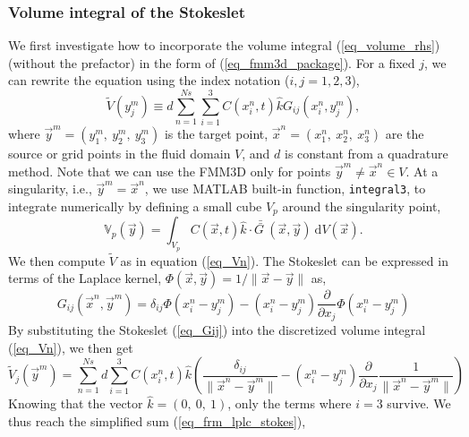 \subsubsection{Volume integral of the Stokeslet}
We first investigate how to incorporate the volume integral (\ref{eq_volume_rhs}) (without the prefactor) in the form of (\ref{eq_fmm3d_package}). For a fixed $j$, we can rewrite the equation using the index notation ($i, j = 1,2,3$), 
\begin{equation}
	\tilde{V}(y_j^m)
	\equiv
	 d\sum_{n = 1}^{Ns} \sum_{i = 1}^{3}
	 C(x^n_i,  t)\hat{k} G_{ij}(x_i^n,y_j^m),
	\label{eq_Vn}
\end{equation}
where $\vec{y}^m = (y_1^m, \ y_2^m, \ y_3^m)$ is the target point, $\vec{x}^n = (x_1^n, \ x_2^n, \ x_3^n)$ are the source or grid points in the fluid domain $V$, and $d$ is constant from a quadrature method.
Note that we can use the FMM3D only for points $\vec{y}^m \neq \vec{x}^n \in V$. 
At a singularity, i.e.,  $\vec{y}^m = \vec{x}^n $, we use MATLAB built-in function, \verb+integral3+, to integrate numerically by defining a small cube $V_p$ around the singularity point,
\begin{equation}
	\mathbb{V}_p(\vec{y}) = 
	 \int_{{V}_p}
		C (\vec{x},t ) \hat{k} \cdot 
		\bar{\bar{G \ }} (\vec{x}, \vec{y} ) 
		\ \text{d}V(\vec{x}).
		\label{eq_vol_int_singular}
	\end{equation}
We then compute $\tilde{V}$ as in equation (\ref{eq_Vn}).
The Stokeslet can be expressed in terms of the Laplace kernel, $\Phi(\vec{x},\vec{y}) = 1/{\| \vec{x} - \vec{y} \|}$ as,
\begin{equation}
	G_{ij}(\vec{x}^n, \vec{y}^m)
	 =  \delta_{ij} \Phi \left(  x_i^n - y_j^m\right)
	 - \left( x_i^n - y_j^m \right)
	 \frac{\partial}{\partial  x_j}
	\Phi \left(  x_i^n - y_j^m\right)
	\label{eq_Gij}
\end{equation}
By substituting the Stokeslet (\ref{eq_Gij}) into the discretized volume integral (\ref{eq_Vn}), we then get
\begin{equation}
	\tilde{V}_j (\vec{y}^m)=
	\sum_{n=1}^{Ns}
	d
   \sum_{i = 1}^{3} C(x^n_i,  t)\hat{k}
  	\left(
  	\frac{\delta_{ij}}{\| \vec{x}^n - \vec{y}^m \|}
  	- \left( x_i^n - y_j^m \right)
  	 \frac{\partial}{\partial x_j}
  	\frac{1}{\| \vec{x}^n - \vec{y}^m \|}
  	\right)
 \label{eq_frm_lplc_stokes}
\end{equation}
Knowing that the vector $\hat{k} = (0, \ 0, \ 1)$, only the terms where $i = 3$ survive. We thus reach the simplified sum (\ref{eq_frm_lplc_stokes}),

